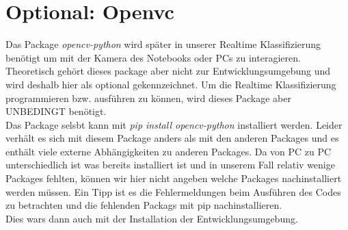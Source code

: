 \section{Optional: Openvc}
Das Package \emph{opencv-python} wird später in unserer Realtime Klassifizierung benötigt um mit der Kamera des Notebooks oder PCs zu interagieren. Theoretisch gehört dieses package aber nicht zur Entwicklungsumgebung und wird deshalb hier als optional gekennzeichnet. Um die Realtime Klassifizierung programmieren bzw. ausführen zu können, wird dieses Package aber UNBEDINGT benötigt.\\
Das Package selsbt kann mit \emph{pip install opencv-python} installiert werden. Leider verhält es sich mit diesem Package anders als mit den anderen Packages und es enthält viele externe Abhängigkeiten zu anderen Packages. Da von PC zu PC unterschiedlich ist was bereits installiert ist und in unserem Fall relativ wenige Packages fehlten, können wir hier nicht angeben welche Packages nachinstalliert werden müssen. Ein Tipp ist es die Fehlermeldungen beim Ausführen des Codes zu betrachten und die fehlenden Packags mit pip nachinstallieren.\\
Dies wars dann auch mit der Installation der Entwicklungsumgebung.
\label{cha:Installation}